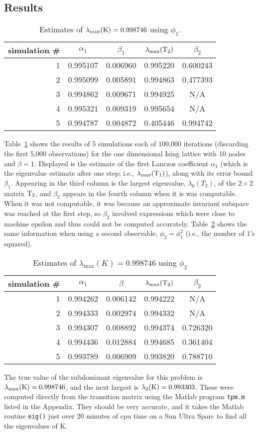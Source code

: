 \subsection{Results}
\begin{table}
\centering
\label{tab:1}
\caption{Estimates of $\lambda_{\max}(\mathrm{K}) = 0.998746$ using $\phi_1$.}
\vskip2mm
\begin{tabular}{r|c|c|c|c}
simulation \# & $\alpha_1$ & $\beta_1$ & $\lambda_{\max}(\mathrm{T}_2)$& $\beta_2$\\
\hline
1& 0.995107& 0.006960& 0.995220& 0.600243\\
2& 0.995099& 0.005891& 0.994863& 0.477393\\
3& 0.994862& 0.009671& 0.994925& N/A\\
4& 0.995321& 0.009319& 0.995654& N/A\\
5& 0.994787& 0.004872& 0.405446& 0.994742
\end{tabular}
\end{table}
Table~\ref{tab:1} shows the results of 5 simulations each of 100,000 iterations (discarding the first
5,000 observations) for the one dimensional Ising lattice with 10 nodes and $\beta= 1$. Displayed is
the estimate of the first Lanczos coefficient $\alpha_1$ (which is the
eigenvalue estimate after one step; i.e., $\lambda_{\max}(\mathrm{T}_1)$), along with its
error bound $\beta_1$. Appearing in the third column is the largest eigenvalue,
$\lambda_0(T_2)$, of the $2 \times 2$ matrix $\mathrm{T}_2$, and $\beta_2$ appears in the
fourth column when it is was computable. When it was not computable, it was
because an approximate invariant subspace was reached 
at the first step, so $\beta_2$ involved expressions which were close to machine
epsilon and thus could not be computed accurately. Table~\ref{tab:2}  shows the same
information when using a second observable, 
$\phi_2 = \phi_1^2$ (i.e., the number of 1's squared).

\begin{table}
\caption{Estimates of $\lambda_{\max}(K) = 0.998746$ using $\phi_2$}
\label{tab:2}
\begin{tabular}{r|c|c|c|c}
simulation \# & $\alpha_1$ & $\beta$ & $\lambda_{\max}(\mathrm{T}_2)$& $\beta_2$\\
\hline
1& 0.994262& 0.006142& 0.994222& N/A\\
2& 0.994333& 0.002974& 0.994332& N/A\\
3& 0.994307& 0.008892& 0.994374& 0.726320\\
4& 0.994436& 0.012884& 0.994685& 0.361404\\
5& 0.993789& 0.006909& 0.993820& 0.788710
\end{tabular}
\end{table}
The true value of the subdominant eigenvalue for this problem is $\lambda_{\max}(\mathrm{K}) = 0.998746$,
and the next largest is $\lambda_2(\mathrm{K}) = 0.993303$. These were computed directly
from the transition matrix 
%
%
%
%
using the Matlab program {\tt tpm.m} listed in the Appendix. They should be very accurate, and it
takes the Matlab routine {\tt eig()} just over 20 minutes of cpu time on a Sun
Ultra Sparc to find all the eigenvalues of K.

